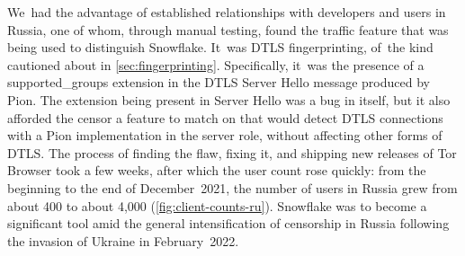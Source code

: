 \documentclass[letterpaper,twocolumn]{article}
\begin{document}
We~had the advantage of established relationships
with developers and users in Russia,
one of whom, through manual testing,
found the traffic feature that was being used to distinguish Snowflake.
It~was DTLS fingerprinting,
of~the kind cautioned about in \autoref{sec:fingerprinting}.
Specifically, it~was the presence of a
\mbox{supported\_groups} extension in the DTLS Server Hello message produced by Pion.
The extension being present in Server Hello was a bug in itself,
but it also afforded the censor a feature to match on
that would detect DTLS connections with a Pion implementation in the server role,
without affecting other forms of DTLS.
The process of finding the flaw, fixing it,
and shipping new releases of Tor Browser took a few weeks,
after which the user count rose quickly:
from the beginning to the end of December~2021,
the number of users in Russia grew from about 400 to about 4,000
(\autoref{fig:client-counts-ru}).
Snowflake was to become a significant tool
amid the general intensification of censorship in Russia
following the invasion of Ukraine in February~2022.
\end{document}
